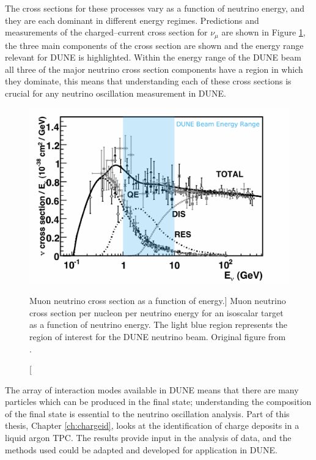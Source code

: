 \bigskip
\noindent
The cross sections for these processes vary as a function of neutrino energy,
and they are each dominant in different energy regimes. Predictions and 
measurements of the charged--current cross section for $\nu_\mu$ are shown in 
Figure \ref{fig:numu_xsec}, the three main components of the cross section are 
shown and the energy range relevant for DUNE is 
highlighted\cite{Formaggio:2013kya}. Within the energy range of the DUNE beam 
all three of the major neutrino cross section components have a region in 
which they dominate, this means that understanding each of these cross 
sections is crucial for any neutrino oscillation measurement in DUNE. 

\begin{figure}
	\centering
	\includegraphics[width=\textwidth]{figures/numu_xsec.pdf}
	\caption
	[Muon neutrino cross section as a function of energy.]
	{Muon neutrino cross section per nucleon per neutrino energy for an isoscalar 
	target as a function of neutrino energy. The light blue region represents the 
	region of interest for the DUNE neutrino beam. Original figure from 
	\cite{Formaggio:2013kya}.}
	\label{fig:numu_xsec}
\end{figure}

The array of interaction modes available in DUNE means that there are many
particles which can be produced in the final state; understanding 
the composition of the final state is essential to the neutrino oscillation 
analysis. Part of this thesis, Chapter \ref{ch:chargeid}, looks at
the identification of charge deposits in a liquid argon TPC. The results 
provide input in the analysis of \protodune{} data, and the methods used could 
be adapted and developed for application in DUNE. 

